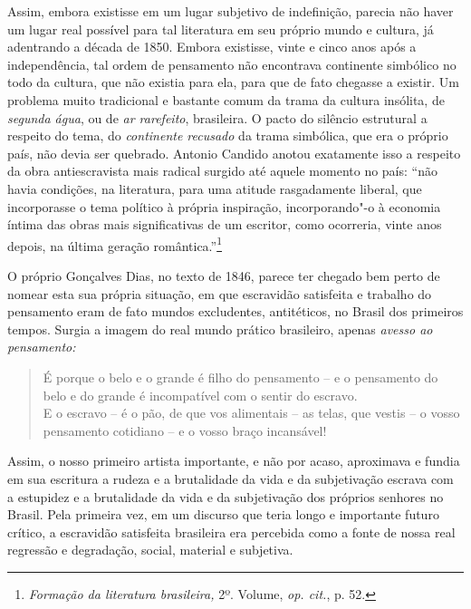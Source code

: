 Assim, embora existisse em um lugar subjetivo de indefinição, parecia
não haver um lugar real possível para tal literatura em seu próprio
mundo e cultura, já adentrando a década de 1850. Embora existisse, vinte
e cinco anos após a independência, tal ordem de pensamento não
encontrava continente simbólico no todo da cultura, que não existia para
ela, para que de fato chegasse a existir. Um problema muito tradicional
e bastante comum da trama da cultura insólita, de \emph{segunda água},
ou de \emph{ar rarefeito}, brasileira. O pacto do silêncio estrutural a
respeito do tema, do \emph{continente recusado} da trama simbólica, que
era o próprio país, não devia ser quebrado. Antonio Candido anotou
exatamente isso a respeito da obra antiescravista mais radical surgido
até aquele momento no país: ``não havia condições, na literatura, para
uma atitude rasgadamente liberal, que incorporasse o tema político à
própria inspiração, incorporando"-o à economia íntima das obras mais
significativas de um escritor, como ocorreria, vinte anos depois, na
última geração romântica.''\footnote{\emph{Formação da literatura
  brasileira,} 2º. Volume, \emph{op. cit.}, p. 52.}

O próprio Gonçalves Dias, no texto de 1846, parece ter chegado bem perto
de nomear esta sua própria situação, em que escravidão satisfeita e
trabalho do pensamento eram de fato mundos excludentes, antitéticos, no
Brasil dos primeiros tempos. Surgia a imagem do real mundo prático
brasileiro, apenas \emph{avesso ao pensamento: }

\begin{quote}
É porque o belo e o grande é filho do pensamento -- e o pensamento do
belo e do grande é incompatível com o sentir do escravo.\\
E o escravo -- é o pão, de que vos alimentais -- as telas, que vestis --
o vosso pensamento cotidiano -- e o vosso braço incansável!
\end{quote}

Assim, o nosso primeiro artista importante, e não por acaso, aproximava
e fundia em sua escritura a rudeza e a brutalidade da vida e da
subjetivação escrava com a estupidez e a brutalidade da vida e da
subjetivação dos próprios senhores no Brasil. Pela primeira vez, em um
discurso que teria longo e importante futuro crítico, a escravidão
satisfeita brasileira era percebida como a fonte de nossa real regressão
e degradação, social, material e subjetiva.

